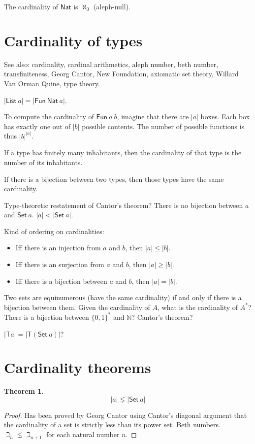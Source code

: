 \documentclass[10pt,statementpaper]{memoir}
\theoremstyle{definition}
\newcounter{thmctr}
\newtheorem{mthm}[thmctr]{Theorem}
\newcommand\sfT{\mathsf{T}}
\newcommand\List[1]{\mathsf{List}~#1}
\newcommand\Nat{\mathsf{Nat}}
\newcommand\sfFun{\mathsf{Fun}}
\newcommand\sfSet{\mathsf{Set}}
\newcommand\Set[1]{\sfSet~#1}
\newcommand\Fun[2]{\sfFun~#1~#2}
\begin{document}
The cardinality of $\Nat$ is $\aleph_0$ (aleph-null).

\section{Cardinality of types}

See also: cardinality, cardinal arithmetics,
aleph number, beth number, transfiniteness, Georg Cantor,
New Foundation, axiomatic set theory, Willard Van Orman Quine, type theory.

$|\List{a}| = |\Fun{\Nat}{a}|$.

To compute the cardinality of $\Fun{a}{b}$,
imagine that there are $|a|$ boxes.
Each box has exactly one out of $|b|$ possible contents.
The number of possible functions is thus $|b|^{|a|}$.

If a type has finitely many inhabitants,
then the cardinality of that type is the number of its inhabitants.

If there is a bijection between two types,
then those types have the same cardinality.

Type-theoretic restatement of Cantor's theorem?
There is no bijection between $a$ and $\Set{a}$.
$|a| < |\Set{a}|$.

Kind of ordering on cardinalities:
\begin{itemize}
    \item Iff there is an injection from $a$ and $b$, then $|a| \le |b|$.
    \item Iff there is an surjection from $a$ and $b$, then $|a| \ge |b|$.
    \item Iff there is a bijection between $a$ and $b$, then $|a| = |b|$.
\end{itemize}

Two sets are equinumerous (have the same cardinality) if and only if there is a bijection between them.
Given the cardinality of $A$, what is the cardinality of $A^*$?
There is a bijection between $\{0,1\}^*$ and $\mathbb{N}$?
Cantor's theorem?

$|\sfT a| = |\sfT (\Set{a})|$?

\section{Cardinality theorems}

\begin{mthm}
    \[
        |a| \lneq |\Set{a}|
    \]
\begin{proof}
    Has been proved by Georg Cantor using Cantor's diagonal argument
    that the cardinality of a set is strictly less than its power set.
    Beth numbers.
    $\beth_n \lneq \beth_{n+1}$ for each natural number $n$.
\end{proof}
\end{mthm}
\end{document}
